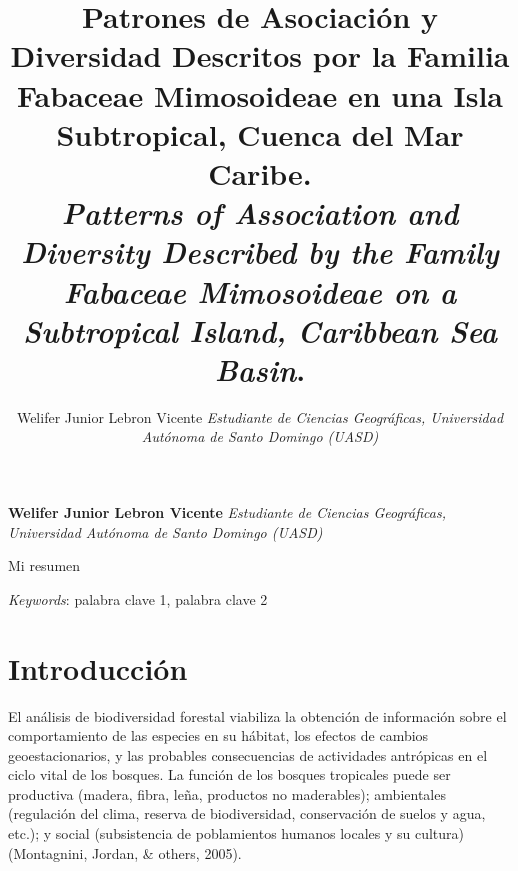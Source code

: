 \documentclass[11pt,]{article}
\title{Patrones de Asociación y Diversidad Descritos por la Familia Fabaceae
Mimosoideae en una Isla Subtropical, Cuenca del Mar Caribe.\\
\emph{Patterns of Association and Diversity Described by the Family
Fabaceae Mimosoideae on a Subtropical Island, Caribbean Sea Basin}.\\  }
\author{\Large Welifer Junior Lebron Vicente\vspace{0.05in} \newline\normalsize\emph{Estudiante de Ciencias Geográficas, Universidad Autónoma de Santo
Domingo (UASD)}  }
\date{}
\newcommand*{\authorfont}{\fontfamily{phv}\selectfont}
\renewenvironment{abstract}
 {{%
    \setlength{\leftmargin}{0mm}
    \setlength{\rightmargin}{\leftmargin}%
  }%
  \relax}
 {\endlist}
\begin{document}
	
%

{%
\setlength{\parindent}{0pt}
\thispagestyle{plain}
{\fontsize{18}{20}\selectfont\raggedright 
\maketitle  %

}

{
   \vskip 13.5pt\relax \normalsize\fontsize{11}{12} 
\textbf{\authorfont Welifer Junior Lebron Vicente} \hskip 15pt \emph{\small Estudiante de Ciencias Geográficas, Universidad Autónoma de Santo
Domingo (UASD)}   

}

}








\begin{abstract}

    \hbox{\vrule height .2pt width 39.14pc}

    \vskip 8.5pt %

\noindent Mi resumen


\vskip 8.5pt \noindent \emph{Keywords}: palabra clave 1, palabra clave 2 \par

    \hbox{\vrule height .2pt width 39.14pc}



\end{abstract}


\vskip 6.5pt


\noindent  \section{Introducción}\label{introducciuxf3n}

El análisis de biodiversidad forestal viabiliza la obtención de
información sobre el comportamiento de las especies en su hábitat, los
efectos de cambios geoestacionarios, y las probables consecuencias de
actividades antrópicas en el ciclo vital de los bosques. La función de
los bosques tropicales puede ser productiva (madera, fibra, leña,
productos no maderables); ambientales (regulación del clima, reserva de
biodiversidad, conservación de suelos y agua, etc.); y social
(subsistencia de poblamientos humanos locales y su cultura) (Montagnini,
Jordan, \& others, 2005).
\end{document}
